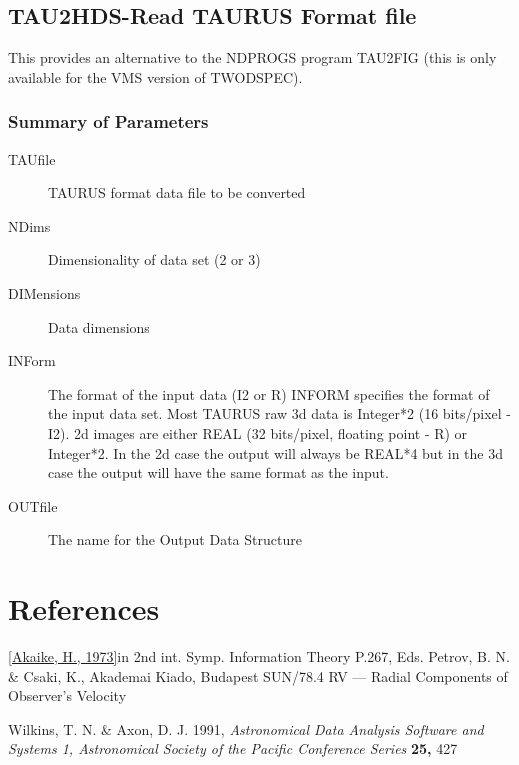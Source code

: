 \subsection{TAU2HDS-Read TAURUS Format file}

This provides an alternative to the NDPROGS program TAU2FIG (this is
only available for the VMS version of TWODSPEC).

\subsubsection{Summary of Parameters}

\begin{description}
\item[TAUfile] TAURUS format data file to be converted
\item[NDims] Dimensionality of data set (2 or 3)
\item[DIMensions] Data dimensions
\item[INForm] The format of the input data (I2 or R)
INFORM specifies the format of the input data set.
Most TAURUS raw 3d data is Integer*2 (16 bits/pixel - I2).
2d images are  either REAL (32 bits/pixel, floating point - R) or
Integer*2.
In the 2d case the output will always be REAL*4 but in the 3d case the
output will have the same format as the input.
\item[OUTfile] The name for the Output Data Structure
\end{description}


\section*{References}

\begin{description}
\cref{Akaike, H., 1973}{in 2nd int. Symp. Information Theory}
{P.267, Eds. Petrov, B. N. \& Csaki, K., Akademai Kiado, Budapest}{}
{SUN/78.4 RV --- Radial Components of Observer's Velocity}
\item{Wilkins, T. N. \& Axon, D. J. 1991, }{\it Astronomical Data Analysis
Software and Systems 1, Astronomical Society of the Pacific Conference Series }
{\bf 25,}{ 427}
\end{description}

